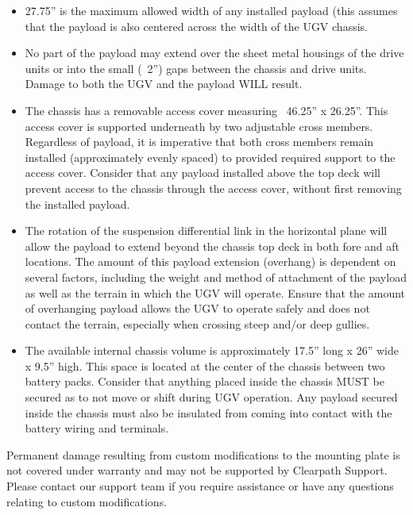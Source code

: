 \documentclass[]{clearpath-latex/clearpath-manual}
\begin{document}
\begin{itemize}[nolistsep]

\item 27.75” is the maximum allowed width of any installed payload (this assumes that the payload is also centered across the width of the UGV chassis.

\item  No part of the payload may extend over the sheet metal housings of the drive units or into the small (~2”) gaps between the chassis and drive units. Damage to both the UGV and the payload WILL result.

\item  The chassis has a removable access cover measuring ~46.25” x 26.25”. This access cover is supported underneath by two adjustable cross members. Regardless of payload, it is imperative that both cross members remain installed (approximately evenly spaced) to provided required support to the access cover. Consider that any payload installed above the top deck will prevent access to the chassis through the access cover, without first removing the installed payload.

\item  The rotation of the suspension differential link in the horizontal plane will allow the payload to extend beyond the chassis top deck in both fore and aft locations. The amount of this payload extension (overhang) is dependent on several factors, including the weight and method of attachment of the payload as well as the terrain in which the UGV will operate. Ensure that the amount of overhanging payload allows the UGV to operate safely and does not contact the terrain, especially when crossing steep and/or deep gullies.

\item  The available internal chassis volume is approximately 17.5” long x 26” wide x 9.5” high. This space is located at the center of the chassis between two battery packs. Consider that anything placed inside the chassis MUST be secured as to not move or shift during UGV operation. Any payload secured inside the chassis must also be insulated from coming into contact with the battery wiring and terminals.

\end{itemize}




\begin{warning}[]
Permanent damage resulting from custom modifications to the mounting plate is not covered under warranty and may not be supported by Clearpath Support.  Please contact our support team if you require assistance or have any questions relating to custom modifications.
\end{warning}
\end{document}
